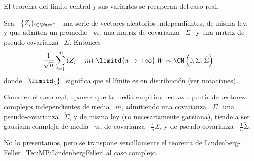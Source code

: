 El teorema del l\'imite central y sus variantes se recuperan del caso real.
%
\begin{teorema}
\label{Teo:MP:CLTComplejo}
%
  Sea  \  $\{  Z_i \}_{i  \in  \Nset^*}$  \  una  serie de  vectores  aleatorios
  independientes, de misma  ley, y que admiten un promedio \  $m$, una matriz de
  covarianza   \   $\Sigma$   \    y   una   matriz   de   pseudo-covarianza   \
  $\check{\Sigma}$. Entonces
  \[
  \frac{1}{\sqrt{n}}  \sum_{i=1}^m  \left( Z_i  -  m  \right)  \: \limitd{n  \to
    +\infty} \: W \sim \CN\left( 0 , \Sigma , \check{\Sigma} \right)
  \]
  donde  \ $\limitd{}$ \  significa que  el l\'imite  es en  distribuci\'on (ver
  notaciones).
\end{teorema}
%
%
Como en el caso real, aparece que  la media empirica hechas a partir de vectores
complejos independientes de media \  $m$, admitiendo una covarianza \ $\Sigma$ \
una  pseudo-covarianza \  $\check{\Sigma}$, y  de misma  ley  (no necesariamente
gausiana),  tiende a  ser gausiana  compleja  de media  \ $m$,  de covarianza  \
$\frac{1}{n} \Sigma$, y de pseudo-covarianza \ $\frac{1}{n} \check{\Sigma}$.

No   lo   presentamos,  pero   se   transpone   sencillamente   el  teorema   de
Lindenberg-Feller~\ref{Teo:MP:LindenbergFeller} al caso complejo.

